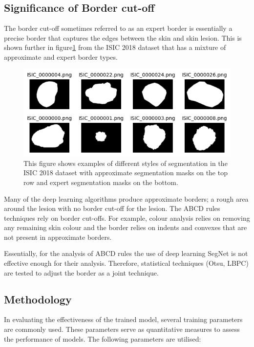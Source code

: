 \subsection{Significance of Border cut-off}
The border cut-off sometimes referred to as an expert border is essentially a precise border that captures the edges between the skin and skin lesion. This is shown further in figure\ref{seg-expert} from the ISIC 2018 dataset that has a mixture of approximate and expert border types. 

\begin{figure}[]
    \centering
    \includegraphics[scale=0.9]{images/segmentation/seg-expert-approx.png}
    \caption{This figure shows examples of different styles of segmentation in the ISIC 2018 dataset with approximate segmentation masks on the top row and expert segmentation masks on the bottom.}\label{seg-expert}
\end{figure}

Many of the deep learning algorithms produce approximate borders; a rough area around the lesion with no border cut-off for the lesion. The ABCD rules techniques rely on border cut-offs. For example, colour analysis relies on removing any remaining skin colour and the border relies on indents and convexes that are not present in approximate borders.

Essentially, for the analysis of ABCD rules the use of deep learning SegNet is not effective enough for their analysis. Therefore, statistical techniques (Otsu, LBPC) are tested to adjust the border as a joint technique.

\subsection{Methodology}
In evaluating the effectiveness of the trained model, several training parameters are commonly used. These parameters serve as quantitative measures to assess the performance of models. The following parameters are utilised:

